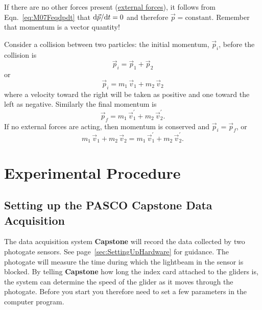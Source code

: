If there are no other forces present (\underline{external forces}), it follows from Eqn.~\ref{eq:M07Feqdpdt} that ${\rm d}\vec{p} / {\rm d}t = 0$ and therefore $\vec{p} = \mbox{constant}$.  Remember that momentum is a vector quantity!

Consider a collision between two particles: the initial momentum, $\vec{p}_i$, before the collision is
\[
\vec{p}_i = \vec{p}_1 + \vec{p}_2
\]
or
\begin{equation}
  \label{eq:M07pi}
  \vec{p}_i = m_1 \,\vec{v}_1 + m_2 \,\vec{v}_2
\end{equation}
where a velocity toward the right will be taken as positive and one toward the left as negative.  Similarly the final momentum is
\begin{equation}
  \label{eq:M07pf}
  \vec{p}_f = m_1 \,\vec{v}_1^\prime + m_2 \,\vec{v}_2^\prime.
\end{equation}
If no external forces are acting, then momentum is conserved and $\vec{p}_i = \vec{p}_f$, or
\begin{equation}
  \label{eq:M07conservation}
  m_1 \,\vec{v}_1 + m_2 \,\vec{v}_2 = m_1 \,\vec{v}_1^\prime + m_2 \,\vec{v}_2^\prime.
\end{equation}

\section{Experimental Procedure}

\subsection{Setting up the PASCO Capstone Data Acquisition}
The data acquisition system \textbf{Capstone} will record the data collected by two photogate sensors. See page~\ref{sec:SettingUpHardware} for guidance. The photogate will measure the time during which the lightbeam in the sensor is blocked. By telling \textbf{Capstone} how long the index card attached to the gliders is, the system can determine the speed of the glider as it moves through the photogate. Before you start you therefore need to set a few parameters in the computer program.

